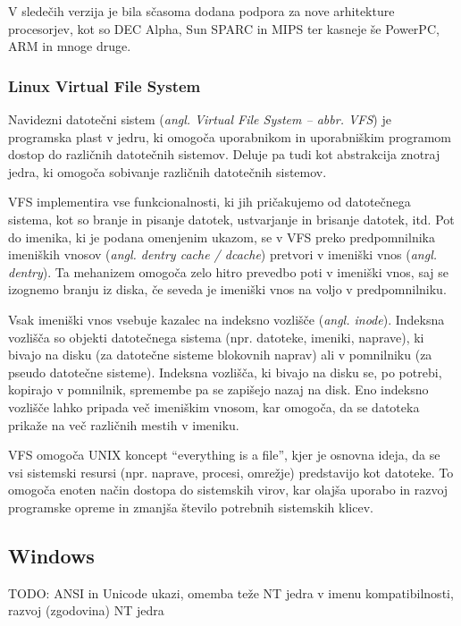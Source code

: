 \documentclass[a4paper,12pt,openright]{book}
\begin{document}
V sledečih verzija je bila sčasoma dodana podpora za nove arhitekture procesorjev, kot so DEC Alpha, Sun SPARC in MIPS ter kasneje še PowerPC, ARM in mnoge druge.
\cite{Silberschatz_Galvin_Gagne_2018}

\subsubsection{Linux Virtual File System}

Navidezni datotečni sistem (\textit{angl. Virtual File System -- abbr. VFS}) je programska plast v jedru, ki omogoča uporabnikom in uporabniškim programom dostop do različnih datotečnih sistemov.
Deluje pa tudi kot abstrakcija znotraj jedra, ki omogoča sobivanje različnih datotečnih sistemov.

VFS implementira vse funkcionalnosti, ki jih pričakujemo od datotečnega sistema, kot so branje in pisanje datotek, ustvarjanje in brisanje datotek, itd.
Pot do imenika, ki je podana omenjenim ukazom, se v VFS preko predpomnilnika imeniških vnosov (\textit{angl. dentry cache / dcache}) pretvori v imeniški vnos (\textit{angl. dentry}).
Ta mehanizem omogoča zelo hitro prevedbo poti v imeniški vnos, saj se izognemo branju iz diska, če seveda je imeniški vnos na voljo v predpomnilniku.

Vsak imeniški vnos vsebuje kazalec na indeksno vozlišče (\textit{angl. inode}). Indeksna vozlišča so objekti datotečnega sistema (npr. datoteke, imeniki, naprave), ki bivajo na disku (za datotečne sisteme blokovnih naprav) ali v pomnilniku (za pseudo datotečne sisteme).
Indeksna vozlišča, ki bivajo na disku se, po potrebi, kopirajo v pomnilnik, spremembe pa se zapišejo nazaj na disk.
Eno indeksno vozlišče lahko pripada več imeniškim vnosom, kar omogoča, da se datoteka prikaže na več različnih mestih v imeniku.
\cite{Kernel_docs_LVFS}

VFS omogoča UNIX koncept ``everything is a file'', kjer je osnovna ideja, da se vsi sistemski resursi (npr. naprave, procesi, omrežje) predstavijo kot datoteke.
To omogoča enoten način dostopa do sistemskih virov, kar olajša uporabo in razvoj programske opreme in zmanjša število potrebnih sistemskih klicev.

\subsection{Windows}

TODO: ANSI in Unicode ukazi, omemba teže NT jedra v imenu kompatibilnosti, razvoj (zgodovina) NT jedra
\end{document}
